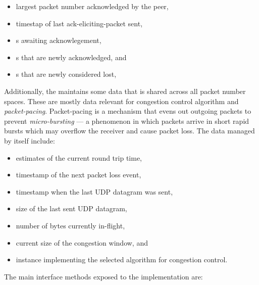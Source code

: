 \begin{itemize}

  \item largest packet number acknowledged by the peer,

  \item timestap of last \gls{ack-eliciting-packet} sent,

  \item \SentPacket{}s awaiting acknowlegement,

  \item \SentPacket{}s that are newly acknowledged, and

  \item \SentPacket{}s that are newly considered lost,

\end{itemize}

Additionally, the \RecoveryController{} maintains some data that is shared across all packet number
spaces. These are mostly data relevant for congestion control algorithm and
\textit{\gls{packet-pacing}}. Packet-pacing is a mechanism that evens out outgoing packets to
prevent \textit{\gls{micro-bursting}} --- a phenomenon in which packets arrive in short rapid bursts
which may overflow the receiver and cause packet loss. The data managed by \RecoveryController{}
itself include:

\begin{itemize}

  \item estimates of the current round trip time,

  \item timestamp of the next packet loss event,

  \item timestamp when the last UDP datagram was sent,

  \item size of the last sent UDP datagram,

  \item number of bytes currently in-flight,

  \item current size of the congestion window, and

  \item \ICongestionController{} instance implementing the selected algorithm for congestion
control.

\end{itemize}

The main interface methods exposed to the \ManagedQuicConnection{} implementation are:

